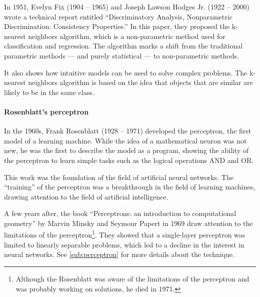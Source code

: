 In 1951, Evelyn Fix (1904 -- 1965) and Joseph Lawson Hodges Jr. (1922 -- 2000) wrote a
technical report entitled ``Discriminatory Analysis, Nonparametric Discrimination:
Consistency Properties.''  In this paper, they proposed the k-nearest neighbors algorithm,
which is a non-parametric method used for classification and regression.  The algorithm
marks a shift from the traditional parametric methods --- and purely statistical ---
to non-parametric methods.

It also shows how intuitive models can be used to solve complex problems.  The k-nearest
neighbors algorithm is based on the idea that objects that are similar are likely to be in
the same class.


\paragraph{Rosenblatt's perceptron}

In the 1960s, Frank Rosenblatt (1928 -- 1971) developed the perceptron, the first model of
a learning machine.  While the idea of a mathematical neuron was not new, he was the first
to describe the model as a program, showing the ability of the perceptron to learn simple
tasks such as the logical operations AND and OR.

This work was the foundation of the field of artificial neural networks.  The ``training''
of the perceptron was a breakthrough in the field of learning machines, drawing attention
to the field of artificial intelligence.


A few years after, the book ``Perceptrons: an introduction to computational geometry'' by
Marvin Minsky and Seymour Papert in 1969 draw attention to the limitations of the
perceptron\footnote{Although the Rosenblatt was aware of the limitations of the perceptron
and was probably working on solutions, he died in 1971.}. They showed that a single-layer
perceptron was limited to linearly separable problems, which led to a decline in the
interest in neural networks.
See \cref{sub:perceptron} for more details about the technique.

